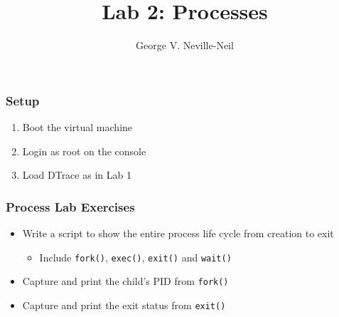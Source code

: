 \documentclass[pdftex,handout]{beamer}
\begin{document}

\title{Lab 2: Processes}
\author[shortname]{George V. Neville-Neil}

\begin{frame}
  \frametitle{Setup}
  \begin{enumerate}
  \item Boot the virtual machine
  \item Login as root on the console
  \item Load DTrace as in Lab 1
  \end{enumerate}
\end{frame}

\begin{frame}[fragile]
  \frametitle{Process Lab Exercises}
  \begin{itemize}
  \item Write a script to show the entire process life cycle from creation
    to exit
    \begin{itemize}
    \item Include \texttt{fork()}, \texttt{exec()}, \texttt{exit()} and
      \texttt{wait()}
    \end{itemize}
  \item Capture and print the child's PID from \texttt{fork()}
  \item Capture and print the exit status from \texttt{exit()}
  \end{itemize}
\end{frame}
\end{document}
